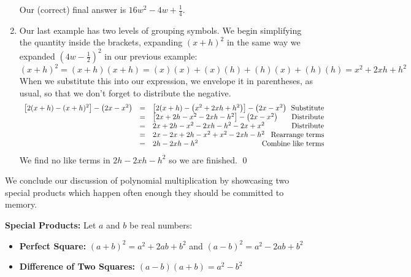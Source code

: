 \documentclass{ximera}
\begin{document}
\begin{ex}
\begin{enumerate}
Our (correct) final answer is $16w^2 - 4w + \frac{1}{4}$.

\item  Our last example has two levels of grouping symbols.  We begin simplifying the quantity inside the brackets, expanding $(x+h)^2$ in the same way we expanded $(4w - \frac{1}{2})^{2}$ in our previous example: \[ (x+h)^2 = (x+h)(x+h) = (x)(x) + (x)(h) + (h)(x) + (h)(h) = x^2 + 2xh + h^2 \]  When we substitute this into our expression, we envelope it in parentheses, as usual, so that we don't forget to distribute the negative.\[ \begin{array}{rclr}
					
\left[2(x+h) - (x+h)^2\right] - \left(2x - x^2 \right) & = & \left[2(x+h) - \left( x^2 + 2xh + h^2\right) \right] - \left(2x - x^2 \right) & \hspace*{-.6in}\text{Substitute} \\
	                                                     & = & \left[2x+2h - x^2-2xh-h^2\right] - \left(2x - x^2 \right) & \hspace*{-6in} \text{Distribute}\\ 
                                                      & = & 2x+2h - x^2-2xh-h^2 -2x + x^2 & \hspace*{-.6in}\text{Distribute} \\ 
																											 & = & 2x - 2x+2h - x^2 + x^2 -2xh-h^2& \hspace*{-.6in}\text{Rearrange terms}\\
																											 & = & 2h-2xh-h^2& \hspace*{-.6in}\text{Combine like terms}\\
																											\end{array} \] We find no like terms in $2h-2xh-h^2$ so we are finished. \qed                                               

\end{enumerate}

\end{ex}



We conclude our discussion of polynomial multiplication by showcasing two special products which happen often enough they should be committed to memory.

\medskip

\colorbox{ResultColor}{\bbm

\begin{thm}\label{SpecialProducts} \textbf{Special Products:} Let $a$ and $b$ be real numbers:

\begin{itemize}

\item \textbf{Perfect Square:}  $(a+b)^2 = a^2 + 2ab + b^2$ and $(a-b)^2 = a^2 - 2ab + b^2$

\item \textbf{Difference of Two Squares:}  $(a-b)(a+b) = a^2 - b^2$ 

\end{itemize}

\end{thm}

\ebm}
\end{document}
